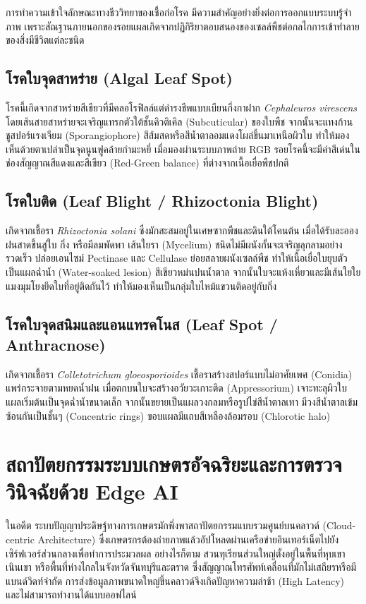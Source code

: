 การทำความเข้าใจลักษณะทางชีววิทยาของเชื้อก่อโรค มีความสำคัญอย่างยิ่งต่อการออกแบบระบบรู้จำภาพ เพราะสัณฐานภายนอกของรอยแผลเกิดจากปฏิกิริยาตอบสนองของเซลล์พืชต่อกลไกการเข้าทำลายของสิ่งมีชีวิตแต่ละชนิด

\subsection{โรคใบจุดสาหร่าย (Algal Leaf Spot)}
โรคนี้เกิดจากสาหร่ายสีเขียวที่มีคลอโรฟิลล์แต่ดำรงชีพแบบเบียนกึ่งกาฝาก \textit{Cephaleuros virescens} โดยเส้นสายสาหร่ายจะเจริญแทรกตัวใต้ชั้นคิวติเคิล (Subcuticular) ของใบพืช จากนั้นจะแทงก้านชูสปอร์แรงเจียม (Sporangiophore) สีส้มสดหรือสีน้ำตาลอมแดงโผล่ขึ้นมาเหนือผิวใบ ทำให้มองเห็นด้วยตาเปล่าเป็นจุดนูนฟูคล้ายกำมะหยี่ เมื่อมองผ่านระบบภาพถ่าย RGB รอยโรคนี้จะมีค่าสีเด่นในช่องสัญญาณสีแดงและสีเขียว (Red-Green balance) ที่ต่างจากเนื้อเยื่อพืชปกติ

\subsection{โรคใบติด (Leaf Blight / Rhizoctonia Blight)}
เกิดจากเชื้อรา \textit{Rhizoctonia solani} ซึ่งมักสะสมอยู่ในเศษซากพืชและดินใต้โคนต้น เมื่อได้รับละอองฝนสาดขึ้นสู่ใบ กิ่ง หรือมีลมพัดพา เส้นใยรา (Mycelium) ชนิดไม่มีผนังกั้นจะเจริญลุกลามอย่างรวดเร็ว ปล่อยเอนไซม์ Pectinase และ Cellulase ย่อยสลายผนังเซลล์พืช ทำให้เนื้อเยื่อใบยุบตัวเป็นแผลฉ่ำน้ำ (Water-soaked lesion) สีเขียวหม่นปนน้ำตาล จากนั้นใบจะแห้งเหี่ยวและมีเส้นใยใยแมงมุมโยงยึดใบที่อยู่ติดกันไว้ ทำให้มองเห็นเป็นกลุ่มใบไหม้แขวนติดอยู่กับกิ่ง

\subsection{โรคใบจุดสนิมและแอนแทรคโนส (Leaf Spot / Anthracnose)}
เกิดจากเชื้อรา \textit{Colletotrichum gloeosporioides} เชื้อราสร้างสปอร์แบบไม่อาศัยเพศ (Conidia) แพร่กระจายตามหยดน้ำฝน เมื่อตกบนใบจะสร้างอวัยวะเกาะติด (Appressorium) เจาะทะลุผิวใบ แผลเริ่มต้นเป็นจุดฉ่ำน้ำขนาดเล็ก จากนั้นขยายเป็นแผลวงกลมหรือรูปไข่สีน้ำตาลเทา มีวงสีน้ำตาลเข้มซ้อนกันเป็นชั้นๆ (Concentric rings) ขอบแผลมีแถบสีเหลืองล้อมรอบ (Chlorotic halo)

\section{สถาปัตยกรรมระบบเกษตรอัจฉริยะและการตรวจวินิจฉัยด้วย Edge AI}

ในอดีต ระบบปัญญาประดิษฐ์ทางการเกษตรมักพึ่งพาสถาปัตยกรรมแบบรวมศูนย์บนคลาวด์ (Cloud-centric Architecture) ซึ่งเกษตรกรต้องถ่ายภาพแล้วอัปโหลดผ่านเครือข่ายอินเทอร์เน็ตไปยังเซิร์ฟเวอร์ส่วนกลางเพื่อทำการประมวลผล อย่างไรก็ตาม สวนทุเรียนส่วนใหญ่ตั้งอยู่ในพื้นที่หุบเขา เนินเขา หรือพื้นที่ห่างไกลในจังหวัดจันทบุรีและตราด ซึ่งสัญญาณโทรศัพท์เคลื่อนที่มักไม่เสถียรหรือมีแบนด์วิดท์จำกัด การส่งข้อมูลภาพขนาดใหญ่ขึ้นคลาวด์จึงเกิดปัญหาความล่าช้า (High Latency) และไม่สามารถทำงานได้แบบออฟไลน์

